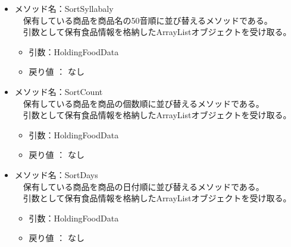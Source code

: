 \documentclass[a4j]{jarticle}
\begin{document}
\begin{itemize}
\item メソッド名：SortSyllabaly\\
  　保有している商品を商品名の50音順に並び替えるメソッドである。\\
  　引数として保有食品情報を格納したArrayListオブジェクトを受け取る。
  \begin{itemize}
  \item 引数：HoldingFoodData
  \item 戻り値 ： なし
  \end{itemize}

\item メソッド名：SortCount\\
  　保有している商品を商品の個数順に並び替えるメソッドである。\\
  　引数として保有食品情報を格納したArrayListオブジェクトを受け取る。
  \begin{itemize}
  \item 引数：HoldingFoodData
  \item 戻り値 ： なし
  \end{itemize}

\item メソッド名：SortDays\\
  　保有している商品を商品の日付順に並び替えるメソッドである。\\
  　引数として保有食品情報を格納したArrayListオブジェクトを受け取る。
  \begin{itemize}
  \item 引数：HoldingFoodData
  \item 戻り値 ： なし
  \end{itemize}
\end{itemize}
\end{document}
